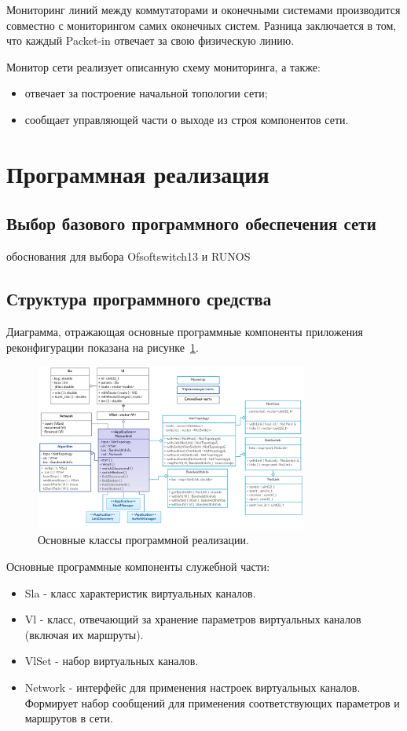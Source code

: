\documentclass[12pt, a4paper]{article}
\begin{document}
Мониторинг линий между коммутаторами и оконечными системами производится совместно с мониторингом самих оконечных систем. Разница заключается в том, что каждый Packet-in отвечает за свою физическую линию.

Монитор сети реализует описанную схему мониторинга, а также:
\begin{itemize}
	\item отвечает за построение начальной топологии сети;
	\item сообщает управляющей части о выходе из строя компонентов сети.
\end{itemize}

\section{Программная реализация}
\subsection{Выбор базового программного обеспечения сети}
обоснования для выбора Ofsoftswitch13 и RUNOS
\subsection{Структура программного средства}
Диаграмма, отражающая основные программные компоненты приложения реконфигурации показана на рисунке~\ref{pic:classes}.

\begin{figure}[h!]
	\centering
	\includegraphics[width=0.80\textwidth]{img/classes.png}
	\caption{Основные классы программной реализации.}
	\label{pic:classes}
\end{figure}


Основные программные компоненты служебной части:
\begin{itemize}
	\item Sla - класс характеристик виртуальных каналов.
	\item Vl - класс, отвечающий за хранение параметров виртуальных каналов (включая их маршруты).
	\item VlSet - набор виртуальных каналов.
	\item Network - интерфейс для применения настроек виртуальных каналов. Формирует набор сообщений для применения соответствующих параметров и маршрутов в сети.
\end{itemize}
\end{document}
